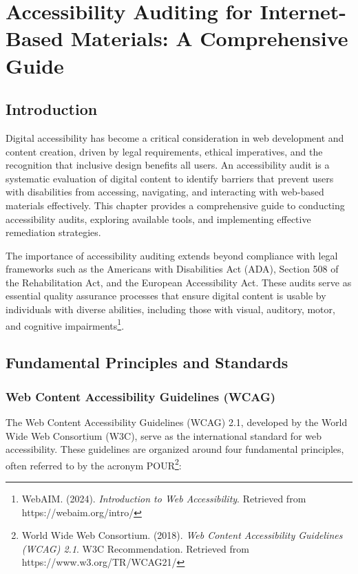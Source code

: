 \chapter{Accessibility Auditing for Internet-Based Materials: A Comprehensive Guide}

\section{Introduction}

Digital accessibility has become a critical consideration in web development and content creation, driven by legal requirements, ethical imperatives, and the recognition that inclusive design benefits all users. An accessibility audit is a systematic evaluation of digital content to identify barriers that prevent users with disabilities from accessing, navigating, and interacting with web-based materials effectively. This chapter provides a comprehensive guide to conducting accessibility audits, exploring available tools, and implementing effective remediation strategies.

The importance of accessibility auditing extends beyond compliance with legal frameworks such as the Americans with Disabilities Act (ADA), Section 508 of the Rehabilitation Act, and the European Accessibility Act. These audits serve as essential quality assurance processes that ensure digital content is usable by individuals with diverse abilities, including those with visual, auditory, motor, and cognitive impairments\footnote{WebAIM. (2024). \textit{Introduction to Web Accessibility}. Retrieved from https://webaim.org/intro/}.

\section{Fundamental Principles and Standards}

\subsection{Web Content Accessibility Guidelines (WCAG)}

The Web Content Accessibility Guidelines (WCAG) 2.1, developed by the World Wide Web Consortium (W3C), serve as the international standard for web accessibility. These guidelines are organized around four fundamental principles, often referred to by the acronym POUR\footnote{World Wide Web Consortium. (2018). \textit{Web Content Accessibility Guidelines (WCAG) 2.1}. W3C Recommendation. Retrieved from https://www.w3.org/TR/WCAG21/}:

